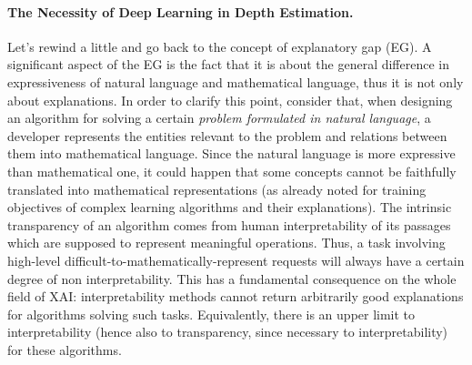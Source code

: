 \paragraph{The Necessity of Deep Learning in Depth Estimation.}
Let's rewind a little and go back to the concept of explanatory gap (EG).
A significant aspect of the EG is the fact that it is about the general difference in expressiveness of natural language and mathematical language, thus it is not only about explanations.
In order to clarify this point, consider that, when designing an algorithm for solving a certain \textit{problem formulated in natural language}, a developer represents the entities relevant to the problem and relations between them into mathematical language.
Since the natural language is more expressive than mathematical one, it could happen that some concepts cannot be faithfully translated into mathematical representations (as already noted for training objectives of complex learning algorithms and their explanations).
The intrinsic transparency of an algorithm comes from human interpretability of its passages which are supposed to represent meaningful operations.
Thus, a task involving high-level difficult-to-mathematically-represent requests will always have a certain degree of non interpretability.
This has a fundamental consequence on the whole field of XAI: interpretability methods cannot return arbitrarily good explanations for algorithms solving such tasks.
Equivalently, there is an upper limit to interpretability (hence also to transparency, since necessary to interpretability) for these algorithms.

